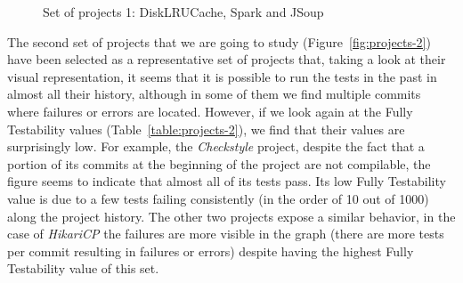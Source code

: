 \begin{figure}[!htb]
\begin{minipage}{.5\textwidth}
        \label{fig:disklrucache}
    \end{minipage}%
    \caption{Set of projects 1: DiskLRUCache, Spark and JSoup}
    \label{fig:projects-1}
\end{figure}

\begin{table}[h!]
    \caption{Metrics of set of projects 1: JSoup, Spark and DiskLRUCache}
    \centering
    \label{table:projects-1}
\end{table}


The second set of projects that we are going to study (Figure~\ref{fig:projects-2}) have been selected as a representative set of projects that, taking a look at their visual representation, it seems that it is possible to run the tests in the past in almost all their history, although in some of them we find multiple commits where failures or errors are located.
However, if we look again at the Fully Testability values (Table~\ref{table:projects-2}), we find that their values are surprisingly low. 
For example, the \textit{Checkstyle} project, despite the fact that a portion of its commits at the beginning of the project are not compilable, the figure seems to indicate that almost all of its tests pass. 
Its low Fully Testability value is due to a few tests failing consistently (in the order of 10 out of 1000) along the project history.
The other two projects expose a similar behavior, in the case of \textit{HikariCP} the failures are more visible in the graph (there are more tests per commit resulting in failures or errors) despite having the highest Fully Testability value of this set.

